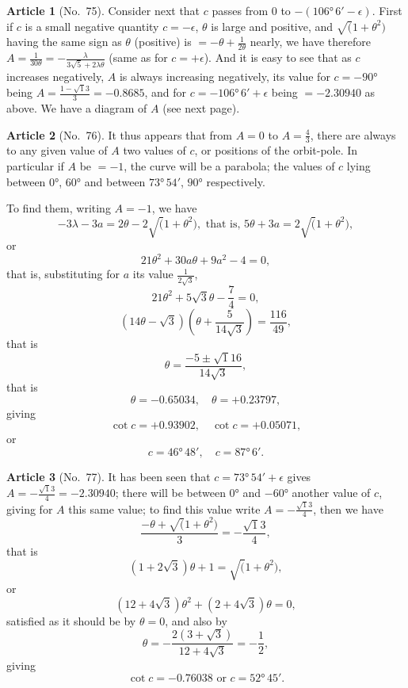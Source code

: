 \documentclass[11pt,a4paper]{article}
\theoremstyle{definition}
\newtheorem{art}{Article}
\begin{document}
\begin{art}[No.~75]
Consider next that $c$ passes from $0$ to $-(106°\, 6' - \epsilon)$. First if $c$ is a small negative quantity $c = -\epsilon$, $\theta$ is large and positive, and $\surd(1 + \theta^2)$ having the same sign as $\theta$ (positive) is $= -\theta + \frac{1}{2\theta}$ nearly, we have therefore $A = \frac{1}{30\theta} = -\frac{\lambda}{3\surd 5 + 2\lambda\theta}$ (same as for $c = +\epsilon$). And it is easy to see that as $c$ increases negatively, $A$ is always increasing negatively, its value for $c = -90°$ being $A = \frac{1 - \surd 13}{3} = -0.8685$, and for $c = -106°\, 6' + \epsilon$ being $= -2.30940$ as above. We have a diagram of $A$ (see next page).
\end{art}

\begin{art}[No.~76]
It thus appears that from $A = 0$ to $A = \frac{4}{3}$, there are always to any given value of $A$ two values of $c$, or positions of the orbit-pole. In particular if $A$ be $= -1$, the curve will be a parabola; the values of $c$ lying between $0°$, $60°$ and between $73°\, 54'$, $90°$ respectively.

To find them, writing $A = -1$, we have
\[
-3\lambda - 3a = 2\theta - 2\surd(1 + \theta^2), \text{ that is, } 5\theta + 3a = 2\surd(1 + \theta^2),
\]
or
\[
21\theta^2 + 30a\theta + 9a^2 - 4 = 0,
\]
that is, substituting for $a$ its value $\frac{1}{2\surd 3}$,
\[
21\theta^2 + 5\surd 3\theta - \frac{7}{4} = 0,
\]
\[
(14\theta - \surd 3)(\theta + \frac{5}{14\surd 3}) = \frac{116}{49},
\]
that is
\[
\theta = \frac{-5 \pm \surd 116}{14\surd 3},
\]
that is
\[
\theta = -0.65034, \quad \theta = +0.23797,
\]
giving
\[
\cot c = +0.93902, \quad \cot c = +0.05071,
\]
or
\[
c = 46°\, 48', \quad c = 87°\, 6'.
\]
\end{art}

\begin{art}[No.~77]
It has been seen that $c = 73°\, 54' + \epsilon$ gives $A = -\frac{\surd 13}{4} = -2.30940$; there will be between $0°$ and $-60°$ another value of $c$, giving for $A$ this same value; to find this value write $A = -\frac{\surd 13}{4}$, then we have
\[
\frac{-\theta + \surd(1 + \theta^2)}{3} = -\frac{\surd 13}{4},
\]
that is
\[
(1 + 2\surd 3)\theta + 1 = \surd(1 + \theta^2),
\]
or
\[
(12 + 4\surd 3)\theta^2 + (2 + 4\surd 3)\theta = 0,
\]
satisfied as it should be by $\theta = 0$, and also by
\[
\theta = -\frac{2(3 + \surd 3)}{12 + 4\surd 3} = -\frac{1}{2},
\]
giving
\[
\cot c = -0.76038 \text{ or } c = 52°\, 45'.
\]
\end{art}
\end{document}
